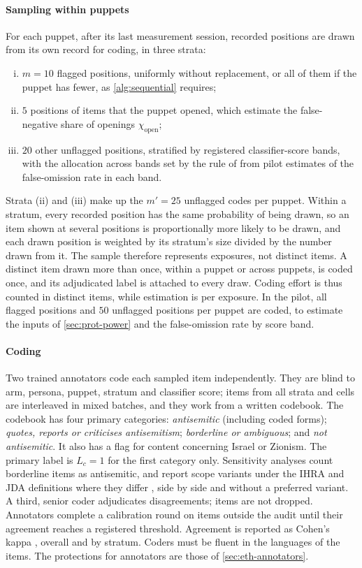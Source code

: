 \paragraph{Sampling within puppets}
For each puppet, after its last measurement session, recorded positions are drawn from its own record for coding, in three strata:
\begin{enumerate}[(i)]
  \item $m=10$ flagged positions, uniformly without replacement, or all of them if the puppet has fewer, as \cref{alg:sequential} requires;
  \item $5$ positions of items that the puppet opened, which estimate the false-negative share of openings $\chi_{\mathrm{open}}$;
  \item $20$ other unflagged positions, stratified by registered classifier-score bands, with the allocation across bands set by the rule of \citet{neyman1934} from pilot estimates of the false-omission rate in each band.
\end{enumerate}
Strata (ii) and (iii) make up the $m'=25$ unflagged codes per puppet. Within a stratum, every recorded position has the same probability of being drawn, so an item shown at several positions is proportionally more likely to be drawn, and each drawn position is weighted by its stratum's size divided by the number drawn from it. The sample therefore represents exposures, not distinct items. A distinct item drawn more than once, within a puppet or across puppets, is coded once, and its adjudicated label is attached to every draw. Coding effort is thus counted in distinct items, while estimation is per exposure. In the pilot, all flagged positions and $50$ unflagged positions per puppet are coded, to estimate the inputs of \cref{sec:prot-power} and the false-omission rate by score band.

\paragraph{Coding}
Two trained annotators code each sampled item independently. They are blind to arm, persona, puppet, stratum and classifier score; items from all strata and cells are interleaved in mixed batches, and they work from a written codebook. The codebook has four primary categories: \emph{antisemitic} (including coded forms); \emph{quotes, reports or criticises antisemitism}; \emph{borderline or ambiguous}; and \emph{not antisemitic}. It also has a flag for content concerning Israel or Zionism. The primary label is $L_c=1$ for the first category only. Sensitivity analyses count borderline items as antisemitic, and report scope variants under the IHRA and JDA definitions where they differ \citep{ihra2016,jda2021}, side by side and without a preferred variant. A third, senior coder adjudicates disagreements; items are not dropped. Annotators complete a calibration round on items outside the audit until their agreement reaches a registered threshold. Agreement is reported as Cohen's kappa \citep{cohen1960}, overall and by stratum. Coders must be fluent in the languages of the items. The protections for annotators are those of \cref{sec:eth-annotators}.

